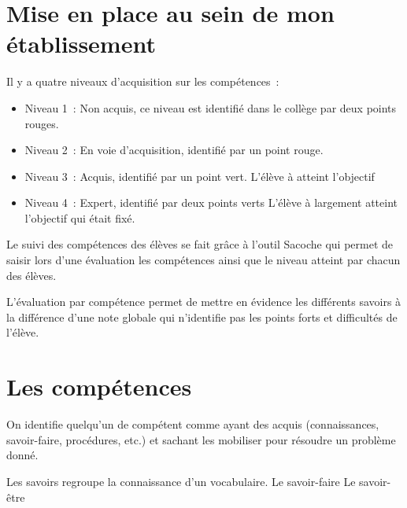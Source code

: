 
\section{Mise en place au sein de mon établissement}

Il y a quatre niveaux d'acquisition sur les compétences~:
\begin{itemize}
\item Niveau 1~: Non acquis, ce niveau est identifié dans le collège par deux points rouges.
\item Niveau 2~: En voie d'acquisition, identifié par un point rouge.
\item Niveau 3~: Acquis, identifié par un point vert. L'élève à atteint l'objectif
\item Niveau 4~: Expert, identifié par deux points verts L'élève à largement atteint l'objectif qui était fixé.
\end{itemize}

Le suivi des compétences des élèves se fait grâce à l'outil Sacoche qui permet de saisir lors d'une évaluation les compétences ainsi que le niveau atteint par chacun des élèves.

L'évaluation par compétence permet de mettre en évidence les différents savoirs à la différence d'une note globale qui n'identifie pas les points forts et difficultés de l'élève.


\section{Les compétences}

On identifie quelqu'un de compétent comme ayant des acquis (connaissances, savoir-faire, procédures, etc.) et sachant les mobiliser pour résoudre un problème donné.

Les savoirs regroupe la connaissance d'un vocabulaire.
Le savoir-faire
Le savoir-être

